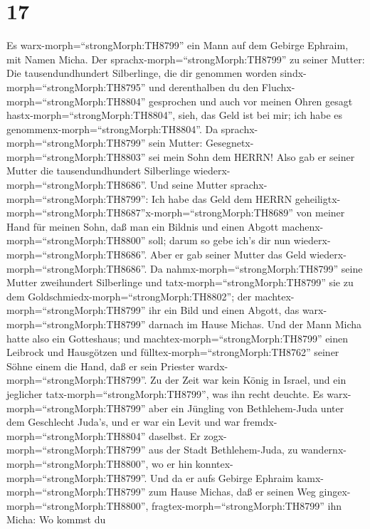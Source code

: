 \hypertarget{section-16}{%
\section{17}\label{section-16}}

 Es warx-morph=``strongMorph:TH8799'' ein Mann auf dem
Gebirge Ephraim, mit Namen Micha.  Der
sprachx-morph=``strongMorph:TH8799'' zu seiner Mutter: Die
tausendundhundert Silberlinge, die dir genommen worden
sindx-morph=``strongMorph:TH8795'' und derenthalben du den
Fluchx-morph=``strongMorph:TH8804'' gesprochen und auch vor meinen Ohren
gesagt hastx-morph=``strongMorph:TH8804'', sieh, das Geld ist bei mir;
ich habe es genommenx-morph=``strongMorph:TH8804''. Da
sprachx-morph=``strongMorph:TH8799'' sein Mutter:
Gesegnetx-morph=``strongMorph:TH8803'' sei mein Sohn dem HERRN!
 Also gab er seiner Mutter die tausendundhundert Silberlinge
wiederx-morph=``strongMorph:TH8686''. Und seine Mutter
sprachx-morph=``strongMorph:TH8799'': Ich habe das Geld dem HERRN
geheiligtx-morph=``strongMorph:TH8687''x-morph=``strongMorph:TH8689''
von meiner Hand für meinen Sohn, daß man ein Bildnis und einen Abgott
machenx-morph=``strongMorph:TH8800'' soll; darum so gebe ich's dir nun
wiederx-morph=``strongMorph:TH8686''.  Aber er gab seiner
Mutter das Geld wiederx-morph=``strongMorph:TH8686''. Da
nahmx-morph=``strongMorph:TH8799'' seine Mutter zweihundert Silberlinge
und tatx-morph=``strongMorph:TH8799'' sie zu dem
Goldschmiedx-morph=``strongMorph:TH8802''; der
machtex-morph=``strongMorph:TH8799'' ihr ein Bild und einen Abgott, das
warx-morph=``strongMorph:TH8799'' darnach im Hause Michas. 
Und der Mann Micha hatte also ein Gotteshaus; und
machtex-morph=``strongMorph:TH8799'' einen Leibrock und Hausgötzen und
fülltex-morph=``strongMorph:TH8762'' seiner Söhne einem die Hand, daß er
sein Priester wardx-morph=``strongMorph:TH8799''.  Zu der
Zeit war kein König in Israel, und ein jeglicher
tatx-morph=``strongMorph:TH8799'', was ihn recht deuchte. 
Es warx-morph=``strongMorph:TH8799'' aber ein Jüngling von
Bethlehem-Juda unter dem Geschlecht Juda's, und er war ein Levit und war
fremdx-morph=``strongMorph:TH8804'' daselbst.  Er
zogx-morph=``strongMorph:TH8799'' aus der Stadt Bethlehem-Juda, zu
wandernx-morph=``strongMorph:TH8800'', wo er hin
konntex-morph=``strongMorph:TH8799''. Und da er aufs Gebirge Ephraim
kamx-morph=``strongMorph:TH8799'' zum Hause Michas, daß er seinen Weg
gingex-morph=``strongMorph:TH8800'', 
fragtex-morph=``strongMorph:TH8799'' ihn Micha: Wo kommst du
